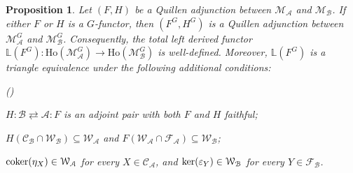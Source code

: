 \documentclass[12pt,twoside]{amsart}
\theoremstyle{bfupright head,slanted body}
\theoremstyle{bfupright head,upright body}
\theoremstyle{fixed bf head,slanted body}
\newtheorem{prp}[res]{Proposition}      \newtheorem*{prp*}{Proposition}
\theoremstyle{fixed bf head,upright body}
\theoremstyle{numbered paragraph}
\newlength{\thmlistleft}        %
\newlength{\thmlistright}       %
\newlength{\thmlistpartopsep}   %
\newlength{\thmlisttopsep}      %
\newlength{\thmlistparsep}      %
\newlength{\thmlistitemsep}     %
\newcounter{prt}
\newenvironment{prt}{\begin{list}{\upshape (\alph{prt})}%
    {\usecounter{prt}%
      \setlength{\leftmargin}{\thmlistleft}%
      \setlength{\labelwidth}{\thmlistleft}%
      \setlength{\rightmargin}{\thmlistright}%
      \setlength{\partopsep}{\thmlistpartopsep}%
      \setlength{\topsep}{\thmlisttopsep}%
      \setlength{\parsep}{\thmlistparsep}%
      \setlength{\itemsep}{\thmlistitemsep}}}%
  {\end{list}}%
\numberwithin{equation}{res}
\newcommand{\calC}{\mathcal{C}}
\newcommand{\calW}{\mathcal{W}}
\newcommand{\calF}{\mathcal{F}}
\newcommand{\calA}{\mathcal{A}}
\newcommand{\calB}{\mathcal{B}}
\newcommand{\calM}{\mathcal{M}}
\newcommand{\Ho}{\mathrm{Ho}}
\newcommand{\cok}{\mbox{\rm coker}}
\newcommand{\kernel}{\mbox{\rm ker}}
\begin{document}
\begin{prp} \label{Quillen adj L(F^G)}
Let $(F, H)$ be a Quillen adjunction between $\calM_\calA$ and $\calM_\calB$.
If either $F$ or $H$ is a $G$-functor, then $(F^G, H^G)$ is a Quillen adjunction between $\calM_\calA^G$ and $\calM_\calB^G$.
Consequently, the total left derived functor $\mathbb{L}(F^G) : \Ho(\calM_\calA^G) \to \Ho(\calM_\calB^G)$ is well-defined.
Moreover, \(\mathbb{L}(F^G)\) is a triangle equivalence under the following additional conditions:
\begin{prt}
  \item $H :\calB \rightleftarrows \calA: F$ is an adjoint pair with both \(F\) and \(H\) faithful;
  \item \(H(\calC_\calB \cap \calW_\calB) \subseteq \calW_\calA\) and \(F(\calW_\calA \cap \calF_\calA) \subseteq \calW_\calB\);
  \item $\cok(\eta_X) \in \calW_\calA$ for every $X \in \calC_\calA$, and $\kernel(\varepsilon_Y) \in \calW_\calB$ for every $Y \in \calF_\calB$.
 \end{prt}
\end{prp}
\end{document}
